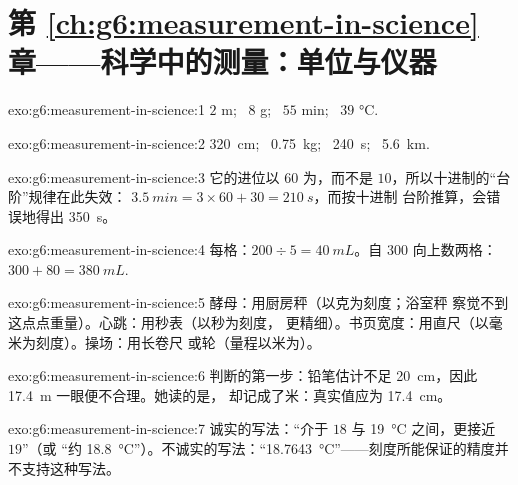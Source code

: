 \section*{第 \ref{ch:g6:measurement-in-science} 章——科学中的测量：单位与仪器}

\begin{solution}{exo:g6:measurement-in-science:1}
$2$ \unit{m}; \ $8$ \unit{g}; \ $55$ \unit{min}; \ $39$
\unit{\celsius}.
\end{solution}

\begin{solution}{exo:g6:measurement-in-science:2}
\qty{320}{cm}; \ \qty{0.75}{kg}; \ \qty{240}{s}; \ \qty{5.6}{km}.
\end{solution}

\begin{solution}{exo:g6:measurement-in-science:3}
它的进位以 $60$ 为，而不是 $10$，所以十进制的“台阶”规律在此失效：
$\qty{3.5}{min} = 3 \times 60 + 30 = \qty{210}{s}$，而按十进制
台阶推算，会错误地得出 \qty{350}{s}。
\end{solution}

\begin{solution}{exo:g6:measurement-in-science:4}
每格：$200 \div 5 = \qty{40}{mL}$。自 $300$ 向上数两格：
$300 + 80 = \qty{380}{mL}$.
\end{solution}

\begin{solution}{exo:g6:measurement-in-science:5}
酵母：用厨房秤（以克为刻度；浴室秤
察觉不到这点点重量）。心跳：用秒表（以秒为刻度，
更精细）。书页宽度：用直尺（以毫米为刻度）。操场：用长卷尺
或轮（量程以米为）。
\end{solution}

\begin{solution}{exo:g6:measurement-in-science:6}
判断的第一步：铅笔估计不足 \qty{20}{cm}，因此
\qty{17.4}{m} 一眼便不合理。她读的是，
却记成了米：真实值应为 \qty{17.4}{cm}。
\end{solution}

\begin{solution}{exo:g6:measurement-in-science:7}
诚实的写法：“介于 $18$ 与 \qty{19}{\celsius} 之间，更接近 $19$”（或
“约 \qty{18.8}{\celsius}”）。不诚实的写法：“\qty{18.7643}
{\celsius}”——刻度所能保证的精度并不支持这种写法。
\end{solution}


